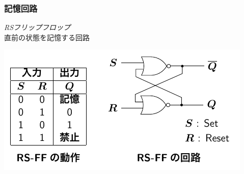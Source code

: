 \documentclass{beamer}                 %
\begin{document}
\begin{frame}
  \frametitle{記憶回路}
  \emph{RSフリップフロップ} \\
  直前の状態を記憶する回路
  \vfill
  \centerline{\includegraphics[scale=1.3]{../Tikz/rsff.pdf}}
  \vfill
\end{frame}
\end{document}
